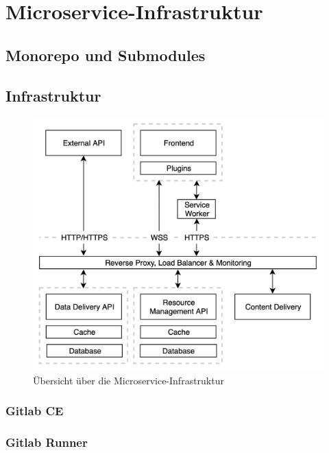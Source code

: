 \chapter{Microservice-Infrastruktur}
\label{chap:microserviceinfrastruktur}

\section{Monorepo und Submodules}
\label{sec:monorepoundsubmodules}

\section{Infrastruktur}
\label{sec:infrastruktur}

\begin{figure}
    \label{figure:microserviceinfrastruktur}
    \begin{center}
    \includegraphics[scale=0.2]{img/MicroserviceInfrastruktur}
    \end{center}
    \caption{Übersicht über die Microservice-Infrastruktur}
\end{figure}

\subsection{Gitlab CE}
\label{subsec:gitlabce}
\subsection{Gitlab Runner}
\label{subsec:gitlabrunner}

